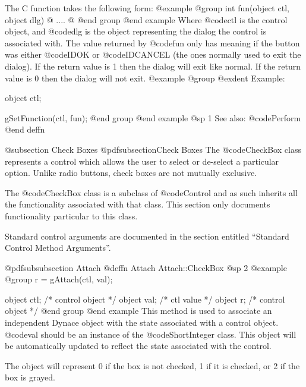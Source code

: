 The C function takes the following form:
@example
@group
int     fun(object ctl, object dlg)
@{
        ....
@}
@end group
@end example
Where @code{ctl} is the control object, and @code{dlg} is the object
representing the dialog the control is associated with.  The value
returned by @code{fun} only has meaning if the button was either
@code{IDOK} or @code{IDCANCEL} (the ones normally used to exit the
dialog).  If the return value is 1 then the dialog will exit like normal.
If the return value is 0 then the dialog will not exit.
@example
@group
@exdent Example:

object  ctl;

gSetFunction(ctl, fun);
@end group
@end example
@sp 1
See also:  @code{Perform}
@end deffn















@subsection Check Boxes
@pdfsubsection{Check Boxes}
The @code{CheckBox} class represents a control which allows the user
to select or de-select a particular option.  Unlike radio buttons,
check boxes are not mutually exclusive.

The @code{CheckBox} class is a subclass of @code{Control} and as such
inherits all the functionality associated with that class.  This section
only documents functionality particular to this class.

Standard control arguments are documented in the section entitled
``Standard Control Method Arguments''.








@pdfsubsubsection {Attach}
@deffn {Attach} Attach::CheckBox
@sp 2
@example
@group
r = gAttach(ctl, val);

object  ctl;   /*  control object  */
object  val;   /*  ctl value       */
object  r;     /*  control object  */
@end group
@end example
This method is used to associate an independent Dynace object with the
state associated with a control object.  @code{val} should be an
instance of the @code{ShortInteger} class.  This object will be
automatically updated to reflect the state associated with the control.

The object will represent 0 if the box is not checked, 1 if it is
checked, or 2 if the box is grayed.

